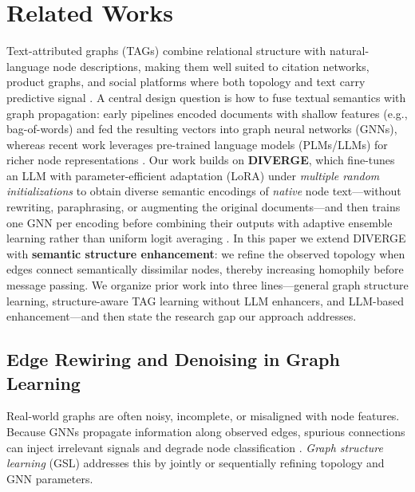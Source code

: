 \documentclass{article}
\begin{document}
\section{Related Works}
\label{sec:related-works}

Text-attributed graphs (TAGs) combine relational structure with natural-language
node descriptions, making them well suited to citation networks, product graphs,
and social platforms where both topology and text carry predictive signal
\citep{Zhang2024TAGSurvey}. A central design question is how to fuse textual
semantics with graph propagation: early pipelines encoded documents with
shallow features (e.g., bag-of-words) and fed the resulting vectors into graph
neural networks (GNNs), whereas recent work leverages pre-trained language models
(PLMs/LLMs) for richer node representations \citep{Chen2024LLaGA,Huang2024GNNAdapters}.
Our work builds on \textbf{DIVERGE}, which fine-tunes an LLM with parameter-efficient
adaptation (LoRA) under \emph{multiple random initializations} to obtain diverse
semantic encodings of \emph{native} node text---without rewriting, paraphrasing,
or augmenting the original documents---and then trains one GNN per encoding before
combining their outputs with adaptive ensemble learning rather than uniform logit
averaging \citep{he2024harnessing}. In this paper we extend DIVERGE with
\textbf{semantic structure enhancement}: we refine the observed topology when
edges connect semantically dissimilar nodes, thereby increasing homophily before
message passing. We organize prior work into three lines---general graph structure
learning, structure-aware TAG learning without LLM enhancers, and LLM-based
enhancement---and then state the research gap our approach addresses.


\subsection{Edge Rewiring and Denoising in Graph Learning}
\label{sec:gsl-general}

Real-world graphs are often noisy, incomplete, or misaligned with node features.
Because GNNs propagate information along observed edges, spurious connections can
inject irrelevant signals and degrade node classification
\citep{zhu2021survey,jin2020prognn}. \emph{Graph structure learning} (GSL) addresses
this by jointly or sequentially refining topology and GNN parameters.
\end{document}
